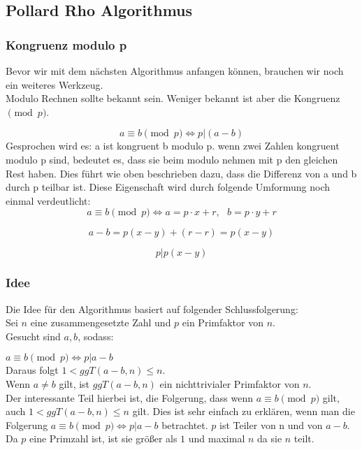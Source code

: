 	
 	\subsection{Pollard Rho Algorithmus}
 	\subsubsection{Kongruenz modulo p}
 		Bevor wir mit dem n\"achsten Algorithmus anfangen k\"onnen, brauchen wir noch ein weiteres Werkzeug.\\
	 	Modulo Rechnen sollte bekannt sein. Weniger bekannt ist aber die Kongruenz $\pmod p$.
 	 
		\[a \equiv b \pmod p \Leftrightarrow p|(a-b)\]
		Gesprochen wird es: a ist kongruent b modulo p. wenn zwei Zahlen kongruent modulo p sind, bedeutet es, dass sie beim modulo nehmen mit p den gleichen Rest haben. Dies f\"uhrt wie oben beschrieben dazu, dass die Differenz von a und b durch p teilbar ist. Diese Eigenschaft wird durch folgende Umformung noch einmal 	verdeutlicht:
		\[a \equiv b \pmod p \Leftrightarrow a=p\cdot x +r,\ \ \ b= p\cdot y +r\]

		\[a-b=p(x-y)+(r-r)=p(x-y)\]

		\[p|p(x-y)\]

 	\subsubsection{Idee}
 	
 	  	Die Idee f\"ur den Algorithmus basiert auf folgender Schlussfolgerung: \\
 	  	Sei $n$ eine zusammengesetzte Zahl und $p$ ein Primfaktor von $n$.\\
 		Gesucht sind $a, b$, sodass:

  		$a \equiv b \pmod p \Leftrightarrow p|a-b$ \\
 		Daraus folgt $1<ggT(a-b,n) \leq  n$. \\Wenn $a\not = b$ gilt, ist $ggT(a-b,n)$ ein nichttrivialer Primfaktor von $n$.\\
 		\newline
		Der interessante Teil hierbei ist, die Folgerung, dass wenn $a \equiv b \pmod p$ gilt, auch $1<ggT(a-b,n) \leq  n$ gilt. Dies ist sehr einfach zu erkl\"aren, wenn man die Folgerung $a \equiv b \pmod p \Leftrightarrow p|a-b$ betrachtet. $p$ ist Teiler von n und von $a-b$. Da $p$ eine Primzahl ist, ist sie gr\"o\ss er als $1$ und maximal $n$ da sie $n$ teilt.
  
